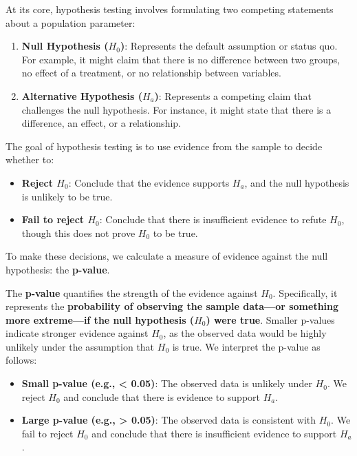 \documentclass[
]{book}
\providecommand{\tightlist}{%
  \setlength{\itemsep}{0pt}\setlength{\parskip}{0pt}}
\theoremstyle{definition}
\theoremstyle{definition}
\theoremstyle{definition}
\theoremstyle{definition}
\theoremstyle{remark}
\begin{document}
At its core, hypothesis testing involves formulating two competing statements about a population parameter:

\begin{enumerate}
\def\labelenumi{\arabic{enumi}.}
\tightlist
\item
  \textbf{Null Hypothesis (\(H_0\))}: Represents the default assumption or status quo. For example, it might claim that there is no difference between two groups, no effect of a treatment, or no relationship between variables.
\item
  \textbf{Alternative Hypothesis (\(H_a\))}: Represents a competing claim that challenges the null hypothesis. For instance, it might state that there is a difference, an effect, or a relationship.
\end{enumerate}

The goal of hypothesis testing is to use evidence from the sample to decide whether to:

\begin{itemize}
\tightlist
\item
  \textbf{Reject \(H_0\)}: Conclude that the evidence supports \(H_a\), and the null hypothesis is unlikely to be true.
\item
  \textbf{Fail to reject \(H_0\)}: Conclude that there is insufficient evidence to refute \(H_0\), though this does not prove \(H_0\) to be true.
\end{itemize}

To make these decisions, we calculate a measure of evidence against the null hypothesis: the \textbf{p-value}.

The \textbf{p-value} quantifies the strength of the evidence against \(H_0\). Specifically, it represents the \textbf{probability of observing the sample data---or something more extreme---if the null hypothesis (\(H_0\)) were true}. Smaller p-values indicate stronger evidence against \(H_0\), as the observed data would be highly unlikely under the assumption that \(H_0\) is true. We interpret the p-value as follows:

\begin{itemize}
\tightlist
\item
  \textbf{Small p-value (e.g., \textless{} 0.05)}: The observed data is unlikely under \(H_0\). We reject \(H_0\) and conclude that there is evidence to support \(H_a\).
\item
  \textbf{Large p-value (e.g., \textgreater{} 0.05)}: The observed data is consistent with \(H_0\). We fail to reject \(H_0\) and conclude that there is insufficient evidence to support \(H_a\).
\end{itemize}
\end{document}
